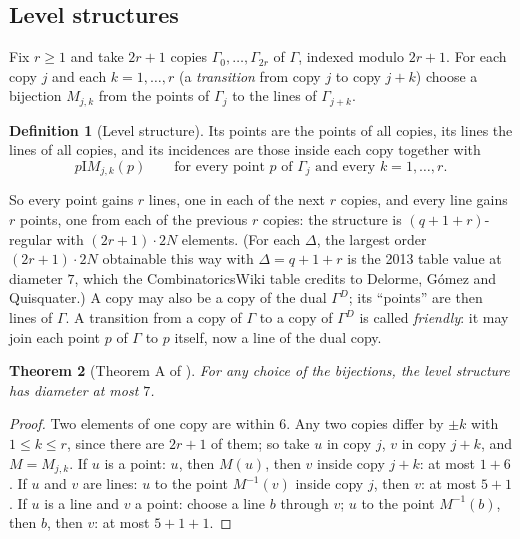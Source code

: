 \documentclass[11pt]{amsart}
\newtheorem{theorem}{Theorem}[section]
\theoremstyle{definition}
\newtheorem{definition}[theorem]{Definition}
\theoremstyle{remark}
\newcommand{\I}{\mathrel{\mathrm{I}}}
\begin{document}
\subsection{Level structures}\label{ssec:levelgraph}
Fix $r\ge1$ and take $2r+1$ copies $\Gamma_0,\dots,\Gamma_{2r}$ of $\Gamma$, indexed modulo $2r+1$. For each copy $j$ and each $k=1,\dots,r$ (a \emph{transition} from copy $j$ to copy $j+k$) choose a bijection $M_{j,k}$ from the points of $\Gamma_j$ to the lines of $\Gamma_{j+k}$.

\begin{definition}[Level structure]\label{def:levelgraph}
Its points are the points of all copies, its lines the lines of all copies, and its incidences are those inside each copy together with
\[
p\I M_{j,k}(p)\qquad\text{for every point $p$ of $\Gamma_j$ and every $k=1,\dots,r$.}
\]
\end{definition}

So every point gains $r$ lines, one in each of the next $r$ copies, and every line gains $r$ points, one from each of the previous $r$ copies: the structure is $(q+1+r)$-regular with $(2r+1)\cdot 2N$ elements. (For each $\Delta$, the largest order $(2r+1)\cdot 2N$ obtainable this way with $\Delta=q+1+r$ is the 2013 table value at diameter $7$, which the CombinatoricsWiki table credits to Delorme, G\'omez and Quisquater.) A copy may also be a copy of the dual $\Gamma^D$; its ``points'' are then lines of $\Gamma$. A transition from a copy of $\Gamma$ to a copy of $\Gamma^D$ is called \emph{friendly}: it may join each point $p$ of $\Gamma$ to $p$ itself, now a line of the dual copy.

\begin{theorem}[Theorem A of ]\label{thm:levelA}
For any choice of the bijections, the level structure has diameter at most $7$.
\end{theorem}

\begin{proof}
Two elements of one copy are within $6$. Any two copies differ by $\pm k$ with $1\le k\le r$, since there are $2r+1$ of them; so take $u$ in copy $j$, $v$ in copy $j+k$, and $M=M_{j,k}$. If $u$ is a point: $u$, then $M(u)$, then $v$ inside copy $j+k$: at most $1+6$. If $u$ and $v$ are lines: $u$ to the point $M^{-1}(v)$ inside copy $j$, then $v$: at most $5+1$. If $u$ is a line and $v$ a point: choose a line $b$ through $v$; $u$ to the point $M^{-1}(b)$, then $b$, then $v$: at most $5+1+1$.
\end{proof}
\end{document}
